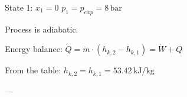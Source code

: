 State 1: \( x_1 = 0 \)  
\( p_{1} = p_{exp} = 8 \, \text{bar} \)  

Process is adiabatic.  

Energy balance:  
\( \dot{Q} = \dot{m} \cdot (h_{k,2} - h_{k,1}) = \dot{W} + Q \)  

From the table:  
\( h_{k,2} = h_{k,1} = 53.42 \, \text{kJ/kg} \)  

---